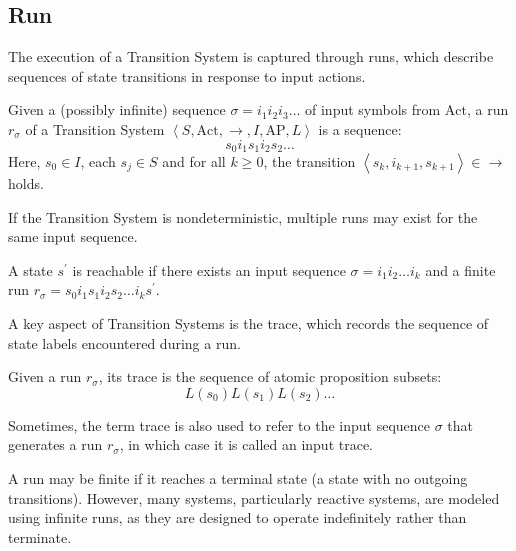 \subsection{Run}
The execution of a Transition System is captured through runs, which describe sequences of state transitions in response to input actions.
\begin{definition}
    Given a (possibly infinite) sequence $\sigma = i_1i_2i_3\dots$ of input symbols from $\text{Act}$, a run $r_\sigma$ of a Transition System $\left\langle S,\text{Act},\rightarrow,I,\text{AP},L\right\rangle$ is a sequence: 
    \[s_0i_1s_1i_2s_2\dots\] 
    Here, $s_0\in I$, each $s_j \in S$ and for all $k \geq 0$, the transition $\left\langle s_k, i_{k+1}, s_{k+1}\right\rangle\in\rightarrow$ holds.
\end{definition}
\noindent If the Transition System is nondeterministic, multiple runs may exist for the same input sequence.
\begin{definition}
    A state $s^\prime$ is reachable if there exists an input sequence $\sigma = i_1i_2\dots i_k$ and a finite run $r_\sigma = s_0 i_1 s_1 i_2 s_2 \dots i_k s^\prime$.
\end{definition}

\noindent A key aspect of Transition Systems is the trace, which records the sequence of state labels encountered during a run.
\begin{definition}
    Given a run $r_\sigma$, its trace is the sequence of atomic proposition subsets:
    \[L(s_0) L(s_1) L(s_2)\dots\]
\end{definition}
\noindent Sometimes, the term trace is also used to refer to the input sequence $\sigma$ that generates a run $r_\sigma$, in which case it is called an input trace.

A run may be finite if it reaches a terminal state (a state with no outgoing transitions).
However, many systems, particularly reactive systems, are modeled using infinite runs, as they are designed to operate indefinitely rather than terminate.